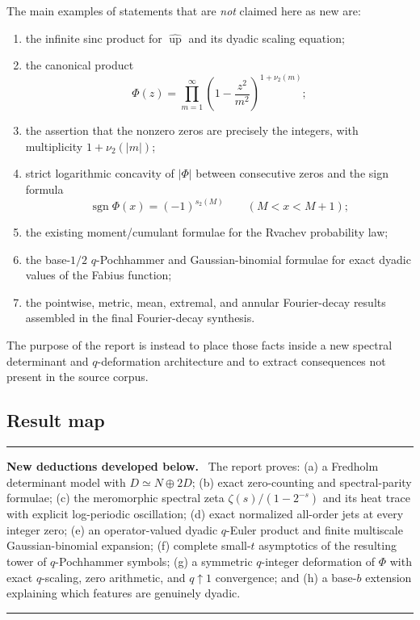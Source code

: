 \documentclass[11pt,oneside]{article}
\numberwithin{equation}{section}
\theoremstyle{plain}
\theoremstyle{definition}
\theoremstyle{remark}
\newcommand{\Up}{\operatorname{up}}
\newcommand{\sgn}{\operatorname{sgn}}
\newenvironment{resultbox}[1]{%
  \par\medskip\noindent\begin{minipage}{\textwidth}%
  \color{DeepGreen}\hrule\vspace{5pt}%
  \color{black}\textbf{\color{DeepGreen}#1.}\ }{%
  \par\vspace{5pt}\color{DeepGreen}\hrule
  \end{minipage}\par\medskip}
\begin{document}
The main examples of statements that are \emph{not} claimed here as new are:
\begin{enumerate}[label=(\roman*),leftmargin=2.1em]
\item the infinite sinc product for $\widehat{\Up}$ and its dyadic scaling equation;
\item the canonical product
\[
 \Phi(z)=\prod_{m=1}^{\infty}\left(1-\frac{z^2}{m^2}\right)^{1+\nu_2(m)};
\]
\item the assertion that the nonzero zeros are precisely the integers, with multiplicity $1+\nu_2(|m|)$;
\item strict logarithmic concavity of $|\Phi|$ between consecutive zeros and the sign formula
\[
 \sgn\Phi(x)=(-1)^{s_2(M)}\qquad(M<x<M+1);
\]
\item the existing moment/cumulant formulae for the Rvachev probability law;
\item the base-$1/2$ $q$-Pochhammer and Gaussian-binomial formulae for exact dyadic values of the Fabius function;
\item the pointwise, metric, mean, extremal, and annular Fourier-decay results assembled in the final Fourier-decay synthesis.
\end{enumerate}

The purpose of the report is instead to place those facts inside a new spectral determinant and $q$-deformation architecture and to extract consequences not present in the source corpus.

\subsection{Result map}

\begin{resultbox}{New deductions developed below}
The report proves: (a) a Fredholm determinant model with $D\simeq N\oplus2D$; (b) exact zero-counting and spectral-parity formulae; (c) the meromorphic spectral zeta $\zeta(s)/(1-2^{-s})$ and its heat trace with explicit log-periodic oscillation; (d) exact normalized all-order jets at every integer zero; (e) an operator-valued dyadic $q$-Euler product and finite multiscale Gaussian-binomial expansion; (f) complete small-$t$ asymptotics of the resulting tower of $q$-Pochhammer symbols; (g) a symmetric $q$-integer deformation of $\Phi$ with exact $q$-scaling, zero arithmetic, and $q\uparrow1$ convergence; and (h) a base-$b$ extension explaining which features are genuinely dyadic.
\end{resultbox}
\end{document}
